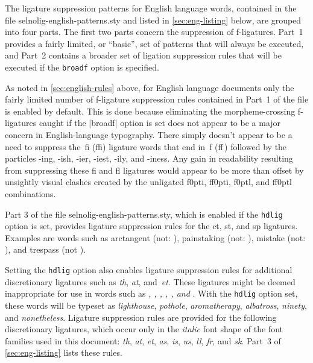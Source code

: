 \documentclass[11pt]{article}
\newcommand{\pkg}[1]{\textsf{#1}}
\newcommand{\opt}[1]{\texttt{#1}}
\begin{document}
The ligature suppression patterns for English language words, contained in the file \pkg{selnolig-english-patterns.sty} and listed in \cref{sec:eng-listing} below, are grouped into four parts. The first two parts concern the suppression of f-ligatures. Part~1 provides a fairly limited, or \enquote{basic}, set of patterns that will always be executed, and Part~2 contains a broader set of ligation suppression rules that will be executed if the \opt{broadf} option is specified. 

As noted in \cref{sec:english-rules} above, for English language documents only the fairly limited number of f-ligature suppression rules contained in Part~1 of the file is enabled by default. This is done because eliminating the morpheme-crossing f-ligatures caught if the |broadf| option is set does not appear to be a major concern in English-language typography. There simply doesn't appear to be a need to suppress the~fi (ffi) ligature words that end in~f (ff\,) followed by the particles -ing, -ish, -ier, -iest, -ily, and -iness. Any gain in readability resulting from suppressing these fi and fl ligatures would appear to be more than offset by unsightly visual clashes created by the unligated f\kern0pti, ff\kern0pti, f\kern0ptl, and ff\kern0ptl combinations.


Part 3 of the file \pkg{selnolig-english-patterns.sty}, which is enabled if the \opt{hdlig} option is set, provides ligature suppression rules for the ct, st, and sp ligatures. Examples are words such as arctangent (not: ), painstaking (not: ), mistake (not: ), and trespass (not ). 

Setting the \opt{hdlig} option also enables ligature suppression rules for additional discretionary ligatures such as \emph{th}, \emph{at}, and~\emph{et}. These ligatures might be deemed inappropriate for use in words such as \emph{, , , , , \emph{and} }. With the \opt{hdlig} option set, these words will be typeset as \emph{lighthouse}, \emph{pothole}, \emph{aromatherapy}, \emph{albatross}, \emph{ninety}, and \emph{nonetheless}. Ligature suppression rules are provided for the following discretionary ligatures, which occur only in the \emph{italic} font shape of the font families used in this document: \emph{th}, \emph{at}, \emph{et}, \emph{as}, \emph{is}, \emph{us}, \emph{ll}, \emph{fr}, and {\ebg \emph{sk}}. Part~3 of \cref{sec:eng-listing} lists these rules.
\end{document}
